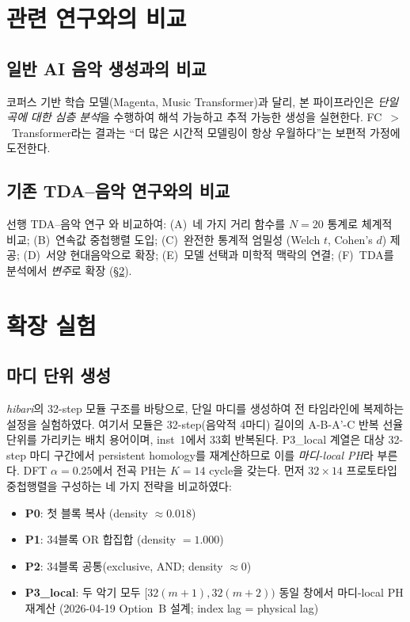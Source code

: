 \documentclass[conference,10pt,a4paper]{IEEEtran}
\begin{document}
\section{관련 연구와의 비교}
\label{sec:differentiation}

\subsection{일반 AI 음악 생성과의 비교}

코퍼스 기반 학습 모델(Magenta, Music Transformer)과 달리,
본 파이프라인은 \emph{단일 곡에 대한 심층 분석}을 수행하여
해석 가능하고 추적 가능한 생성을 실현한다.
FC~$>$~Transformer라는 결과는 ``더 많은 시간적 모델링이 항상
우월하다''는 보편적 가정에 도전한다.

\subsection{기존 TDA--음악 연구와의 비교}

선행 TDA--음악 연구 \cite{tran2021,lee2024}와 비교하여:
(A)~네 가지 거리 함수를 $N{=}20$ 통계로 체계적 비교;
(B)~연속값 중첩행렬 도입;
(C)~완전한 통계적 엄밀성 (Welch $t$, Cohen's $d$) 제공;
(D)~서양 현대음악으로 확장;
(E)~모델 선택과 미학적 맥락의 연결;
(F)~TDA를 분석에서 \emph{변주}로 확장 (\S\ref{sec:extensions}).


\section{확장 실험}
\label{sec:extensions}

\subsection{마디 단위 생성}
\label{subsec:module}

\emph{hibari}의 32-step 모듈 구조를 바탕으로, 단일 마디를 생성하여
전 타임라인에 복제하는 설정을 실험하였다. 여기서 모듈은
32-step(음악적 4마디) 길이의 A-B-A'-C 반복 선율 단위를 가리키는 배치 용어이며,
inst~1에서 33회 반복된다. P3\_local 계열은 대상 32-step 마디 구간에서
persistent homology를 재계산하므로 이를 \emph{마디-local PH}라 부른다.
DFT $\alpha=0.25$에서 전곡 PH는 $K=14$ cycle을 갖는다.
먼저 $32\times14$ 프로토타입 중첩행렬을 구성하는 네 가지 전략을 비교하였다:
\begin{itemize}[nosep]
\item \textbf{P0}: 첫 블록 복사 (density $\approx 0.018$)
\item \textbf{P1}: 34블록 OR 합집합 (density $= 1.000$)
\item \textbf{P2}: 34블록 공통(exclusive, AND; density $\approx 0$)
\item \textbf{P3\_local}: 두 악기 모두 $[32(m+1),32(m+2))$ 동일 창에서
      마디-local PH 재계산 (2026-04-19 Option~B 설계; index lag = physical lag)
\end{itemize}
\end{document}
